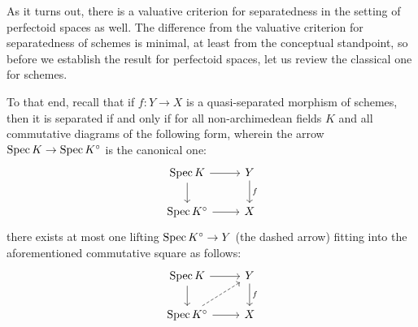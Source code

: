             \begin{remark}
                As it turns out, there is a valuative criterion for separatedness in the setting of perfectoid spaces as well. The difference from the valuative criterion for separatedness of schemes is minimal, at least from the conceptual standpoint, so before we establish the result for perfectoid spaces, let us review the classical one for schemes.
                
                To that end, recall that if $f: Y \to X$ is a quasi-separated morphism of schemes, then it is separated if and only if for all non-archimedean fields $K$ and all commutative diagrams of the following form, wherein the arrow $\operatorname{Spec} K \to \operatorname{Spec} K^{\circ}$ is the canonical one:
                    $$
                        \begin{tikzcd}
                        	{\Spec K} & Y \\
                        	{\Spec K^{\circ}} & X
                        	\arrow["f", from=1-2, to=2-2]
                        	\arrow[from=1-1, to=2-1]
                        	\arrow[from=2-1, to=2-2]
                        	\arrow[from=1-1, to=1-2]
                        \end{tikzcd}
                    $$
                there exists at most one lifting $\operatorname{Spec} K^{\circ} \to Y$ (the dashed arrow) fitting into the aforementioned commutative square as follows:
                    $$
                        \begin{tikzcd}
                        	{\Spec K} & Y \\
                        	{\Spec K^{\circ}} & X
                        	\arrow["f", from=1-2, to=2-2]
                        	\arrow[from=1-1, to=2-1]
                        	\arrow[from=2-1, to=2-2]
                        	\arrow[from=1-1, to=1-2]
                        	\arrow[dashed, from=2-1, to=1-2]
                        \end{tikzcd}
                    $$
            \end{remark}
